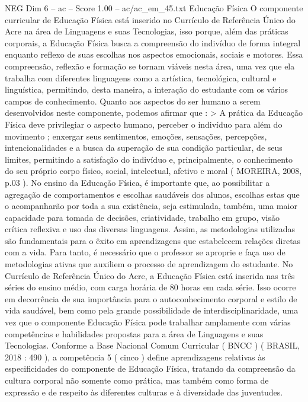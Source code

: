 \begin{textsample}{NEG Dim 6 – ac – Score 1.00 – ac/ac\_em\_45.txt}  \label{ex:f6_neg_140}
Educação Física O componente curricular de Educação Física está inserido no Currículo de Referência Único do Acre na área de Linguagens e suas Tecnologias, isso porque, além das práticas corporais, a Educação Física busca a compreensão do indivíduo de forma integral enquanto reflexo de suas escolhas nos aspectos emocionais, sociais e motores.
Essa compreensão, reflexão e formação se tornam viáveis nesta área, uma vez que ela trabalha com diferentes linguagens como a artística, tecnológica, cultural e linguística, permitindo, desta maneira, a interação do estudante com os vários campos de conhecimento.
Quanto aos aspectos do ser humano a serem desenvolvidos neste componente, podemos afirmar que : > A prática da Educação Física deve privilegiar o aspecto humano, perceber o indivíduo para além do movimento ; enxergar seus sentimentos, emoções, sensações, percepções, intencionalidades e a busca da superação de sua condição particular, de seus limites, permitindo a satisfação do indivíduo e, principalmente, o conhecimento do seu próprio corpo físico, social, intelectual, afetivo e moral ( MOREIRA, 2008, p.03 ).
No ensino da Educação Física, é importante que, ao possibilitar a agregação de comportamentos e escolhas saudáveis dos alunos, escolhas estas que o acompanharão por toda a sua existência, seja estimulada, também, uma maior capacidade para tomada de decisões, criatividade, trabalho em grupo, visão crítica reflexiva e uso das diversas linguagens.
Assim, as metodologias utilizadas são fundamentais para o êxito em aprendizagens que estabelecem relações diretas com a vida.
Para tanto, é necessário que o professor se aproprie e faça uso de metodologias ativas que auxiliem o processo de aprendizagem do estudante.
No Currículo de Referência Único do Acre, a Educação Física está inserida nas três séries do ensino médio, com carga horária de 80 horas em cada série.
Isso ocorre em decorrência de sua importância para o autoconhecimento corporal e estilo de vida saudável, bem como pela grande possibilidade de interdisciplinaridade, uma vez que o componente Educação Física pode trabalhar amplamente com várias competências e habilidades propostas para a área de Linguagens e suas Tecnologias.
Conforme a Base Nacional Comum Curricular ( BNCC ) ( BRASIL, 2018 : 490 ), a competência 5 ( cinco ) define aprendizagens relativas às especificidades do componente de Educação Física, tratando da compreensão da cultura corporal não somente como prática, mas também como forma de expressão e de respeito às diferentes culturas e à diversidade das juventudes.

\end{textsample}
